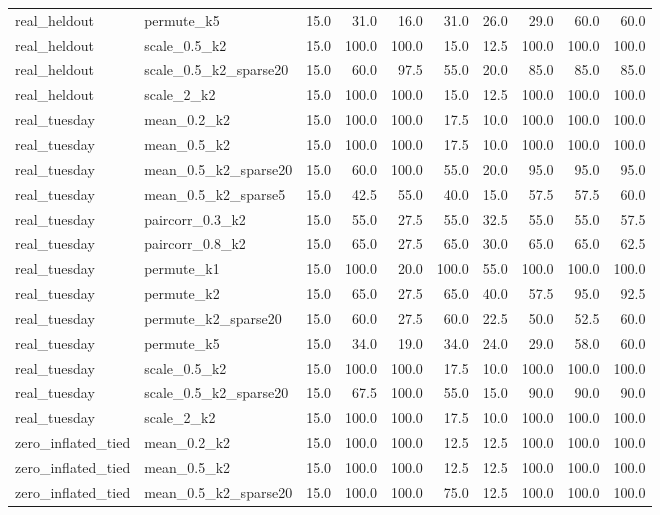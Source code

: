 \begin{table}[!tp]
{\begin{tabular}{llrrrrrrrr}
real\_heldout & permute\_k5 & 15.0 & 31.0 & 16.0 & 31.0 & 26.0 & 29.0 & 60.0 & 60.0 \\
real\_heldout & scale\_0.5\_k2 & 15.0 & 100.0 & 100.0 & 15.0 & 12.5 & 100.0 & 100.0 & 100.0 \\
real\_heldout & scale\_0.5\_k2\_sparse20 & 15.0 & 60.0 & 97.5 & 55.0 & 20.0 & 85.0 & 85.0 & 85.0 \\
real\_heldout & scale\_2\_k2 & 15.0 & 100.0 & 100.0 & 15.0 & 12.5 & 100.0 & 100.0 & 100.0 \\
\midrule
real\_tuesday & mean\_0.2\_k2 & 15.0 & 100.0 & 100.0 & 17.5 & 10.0 & 100.0 & 100.0 & 100.0 \\
real\_tuesday & mean\_0.5\_k2 & 15.0 & 100.0 & 100.0 & 17.5 & 10.0 & 100.0 & 100.0 & 100.0 \\
real\_tuesday & mean\_0.5\_k2\_sparse20 & 15.0 & 60.0 & 100.0 & 55.0 & 20.0 & 95.0 & 95.0 & 95.0 \\
real\_tuesday & mean\_0.5\_k2\_sparse5 & 15.0 & 42.5 & 55.0 & 40.0 & 15.0 & 57.5 & 57.5 & 60.0 \\
real\_tuesday & paircorr\_0.3\_k2 & 15.0 & 55.0 & 27.5 & 55.0 & 32.5 & 55.0 & 55.0 & 57.5 \\
real\_tuesday & paircorr\_0.8\_k2 & 15.0 & 65.0 & 27.5 & 65.0 & 30.0 & 65.0 & 65.0 & 62.5 \\
real\_tuesday & permute\_k1 & 15.0 & 100.0 & 20.0 & 100.0 & 55.0 & 100.0 & 100.0 & 100.0 \\
real\_tuesday & permute\_k2 & 15.0 & 65.0 & 27.5 & 65.0 & 40.0 & 57.5 & 95.0 & 92.5 \\
real\_tuesday & permute\_k2\_sparse20 & 15.0 & 60.0 & 27.5 & 60.0 & 22.5 & 50.0 & 52.5 & 60.0 \\
real\_tuesday & permute\_k5 & 15.0 & 34.0 & 19.0 & 34.0 & 24.0 & 29.0 & 58.0 & 60.0 \\
real\_tuesday & scale\_0.5\_k2 & 15.0 & 100.0 & 100.0 & 17.5 & 10.0 & 100.0 & 100.0 & 100.0 \\
real\_tuesday & scale\_0.5\_k2\_sparse20 & 15.0 & 67.5 & 100.0 & 55.0 & 15.0 & 90.0 & 90.0 & 90.0 \\
real\_tuesday & scale\_2\_k2 & 15.0 & 100.0 & 100.0 & 17.5 & 10.0 & 100.0 & 100.0 & 100.0 \\
\midrule
zero\_inflated\_tied & mean\_0.2\_k2 & 15.0 & 100.0 & 100.0 & 12.5 & 12.5 & 100.0 & 100.0 & 100.0 \\
zero\_inflated\_tied & mean\_0.5\_k2 & 15.0 & 100.0 & 100.0 & 12.5 & 12.5 & 100.0 & 100.0 & 100.0 \\
zero\_inflated\_tied & mean\_0.5\_k2\_sparse20 & 15.0 & 100.0 & 100.0 & 75.0 & 12.5 & 100.0 & 100.0 & 100.0 \\

\end{tabular}}
\end{table}
